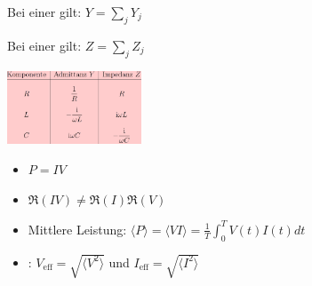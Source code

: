 Bei einer  gilt: $Y = \sum_j Y_j$

\vspace{1\baselineskip}

Bei einer  gilt: $Z = \sum_j Z_j$

\pagebreak

\begin{center}
    \includegraphics[width=0.3\textwidth]{Figures/Komplex.png}
\end{center}

\vspace{1\baselineskip}


\begin{itemize}
    \item $P = I V$
    \item $\Re (IV) \neq \Re(I) \Re(V)$
    \item Mittlere Leistung: $\langle P \rangle = \langle V I \rangle = \frac{1}{T} \int_0^T V(t) I(t) dt$
    \item {}: $V_{\text{eff}} = \sqrt{\langle V^2 \rangle}$ und
            $I_{\text{eff}} = \sqrt{\langle I^2 \rangle}$
\end{itemize}
